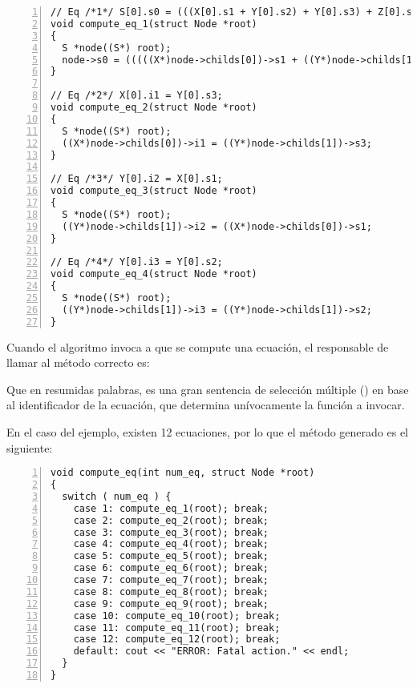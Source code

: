 \begin{lstlisting}[numbers=left, columns=fullflexible]
// Eq /*1*/ S[0].s0 = (((X[0].s1 + Y[0].s2) + Y[0].s3) + Z[0].s4);
void compute_eq_1(struct Node *root)
{
  S *node((S*) root);
  node->s0 = (((((X*)node->childs[0])->s1 + ((Y*)node->childs[1])->s2) + ((Y*)node->childs[1])->s3) + ((Z*)node->childs[2])->s4);
}

// Eq /*2*/ X[0].i1 = Y[0].s3;
void compute_eq_2(struct Node *root)
{
  S *node((S*) root);
  ((X*)node->childs[0])->i1 = ((Y*)node->childs[1])->s3;
}

// Eq /*3*/ Y[0].i2 = X[0].s1;
void compute_eq_3(struct Node *root)
{
  S *node((S*) root);
  ((Y*)node->childs[1])->i2 = ((X*)node->childs[0])->s1;
}

// Eq /*4*/ Y[0].i3 = Y[0].s2;
void compute_eq_4(struct Node *root)
{
  S *node((S*) root);
  ((Y*)node->childs[1])->i3 = ((Y*)node->childs[1])->s2;
}
\end{lstlisting}

Cuando el algoritmo  invoca a que se compute una ecuación, el responsable de llamar al método correcto es:

\begin{center}\end{center}

Que en resumidas palabras, es una gran sentencia de selección múltiple () en base al identificador de la ecuación, que determina unívocamente la función a invocar.

En el caso del ejemplo, existen 12 ecuaciones, por lo que el método generado es el siguiente:

\begin{lstlisting}[numbers=left, columns=fullflexible, linewidth=9.5cm]
void compute_eq(int num_eq, struct Node *root)
{
  switch ( num_eq ) {
    case 1: compute_eq_1(root); break;
    case 2: compute_eq_2(root); break;
    case 3: compute_eq_3(root); break;
    case 4: compute_eq_4(root); break;
    case 5: compute_eq_5(root); break;
    case 6: compute_eq_6(root); break;
    case 7: compute_eq_7(root); break;
    case 8: compute_eq_8(root); break;
    case 9: compute_eq_9(root); break;
    case 10: compute_eq_10(root); break;
    case 11: compute_eq_11(root); break;
    case 12: compute_eq_12(root); break;
    default: cout << "ERROR: Fatal action." << endl;
  }
}
\end{lstlisting}

\normalsize
